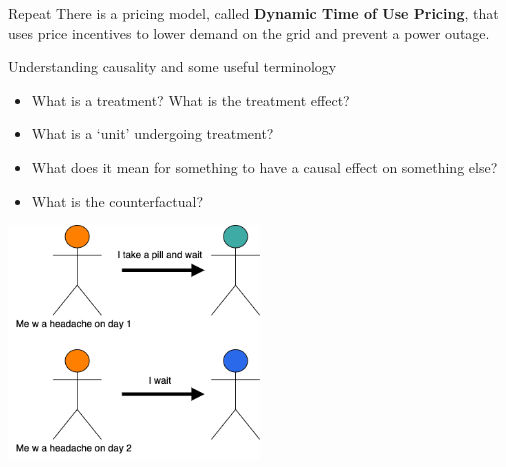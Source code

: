 \documentclass{beamer}
\begin{document}
\begin{frame}{Repeat}
  There is a pricing model, called \textbf{Dynamic Time of Use Pricing}, that uses price incentives to lower demand on the grid and prevent a power outage.
\end{frame}


\begin{frame}{Understanding causality and some useful terminology}
  \begin{itemize}
    \item<+-> What is a treatment? What is the treatment effect?
    \item<+-> What is a `unit' undergoing treatment?
    \item<+-> What does it mean for something to have a causal effect on something else?
    \item<+-> What is the counterfactual?
  \end{itemize}
    \centering
    \includegraphics[width=0.5\textwidth]{images/headache-treatment-effect.png}
\end{frame}
\end{document}
